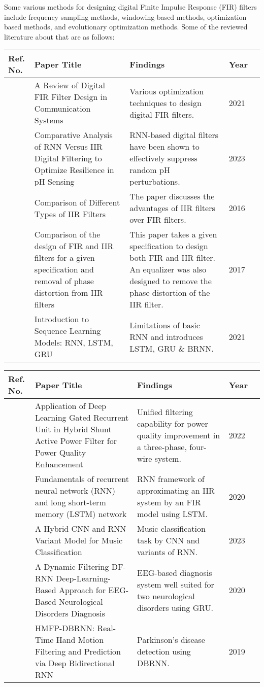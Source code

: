 Some various methods for designing digital Finite Impulse Response (FIR) filters include frequency sampling methods, windowing-based methods, optimization based methods, and evolutionary optimization methods. Some of the reviewed literature about that are as follows:

\noindent
\begin{tabularx}{\columnwidth}{|M|M|M|M|M|}
	\hline
	\textbf{Ref. No.} & \textbf{Paper Title} & \textbf{Findings} & \textbf{Year}\\
	\hline
	\cite{article1} & A Review of Digital FIR Filter Design in Communication Systems & Various optimization techniques to design digital FIR filters. & 2021\\
	\hline
	\cite{202305.0334} & Comparative Analysis of RNN Versus IIR Digital Filtering to Optimize Resilience in pH Sensing & RNN-based digital filters have been shown to effectively suppress random pH perturbations. & 2023\\
	\hline
	\cite{rg1} & Comparison of Different Types of IIR Filters & The paper discusses the advantages of IIR filters over FIR filters. & 2016\\
	\hline
	\cite{rg2} & Comparison of the design of FIR and IIR filters for a given specification and removal of phase distortion from IIR filters &  This paper takes a given specification to design both FIR and IIR filter. An equalizer was also designed to remove the phase distortion of the IIR filter. & 2017\\
	\hline
	\cite{rg3} & Introduction to Sequence Learning Models: RNN, LSTM, GRU & Limitations of basic RNN and introduces LSTM, GRU \& BRNN.& 2021\\
	\hline
\end{tabularx}
\vspace{1\baselineskip}
\noindent
\begin{tabularx}{\columnwidth}{|M|M|M|M|M|}
	\hline
	\textbf{Ref. No.} & \textbf{Paper Title} & \textbf{Findings} & \textbf{Year}\\
	\hline
	\cite{en15207553} & Application of Deep Learning Gated Recurrent Unit in Hybrid Shunt Active Power Filter for Power Quality Enhancement & Unified filtering capability for power quality improvement in a three-phase, four-wire system. & 2022\\
	\hline
	\cite{sherstinsky2020fundamentals} & Fundamentals of recurrent neural network (RNN) and long short-term memory (LSTM) network & RNN framework of approximating an IIR system by an FIR model using LSTM. & 2020\\
	\hline
	\cite{app13031476} & A Hybrid CNN and RNN Variant Model for Music Classification & Music classification task by CNN and variants of RNN. & 2023\\
	\hline
	\cite{9258906} & A Dynamic Filtering DF-RNN Deep-Learning-Based Approach for EEG-Based Neurological Disorders Diagnosis & EEG-based diagnosis
	system well suited for two neurological disorders using GRU. & 2020\\
	\hline
	\cite{8618351} & HMFP-DBRNN: Real-Time Hand Motion Filtering and Prediction via Deep Bidirectional RNN & Parkinson's disease detection using DBRNN. & 2019\\
	\hline
\end{tabularx}

